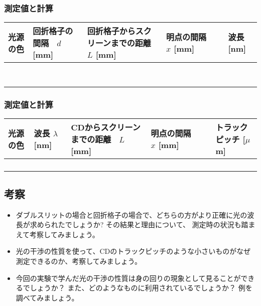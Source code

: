 \newpage

\subjikken{}
\subsubsection*{測定値と計算}
\hspace*{-\parindent}
\begin{tabular}{|p{1.5cm}|p{3.2cm}|p{3.2cm}|p{3.2cm}|p{3.2cm}|}
\hline
光源の色 & 回折格子の間隔　$d$ [mm] & 回折格子からスクリーンまでの距離 $L$ [mm] & 明点の間隔　　　$x$ [mm] & 波長
[nm] \\
\hline\hline
&&&&\\
\hline
&&&&\\
\hline
&&&&\\
\hline
&&&&\\
\hline
&&&&\\
\hline
&&&&\\
\hline
&&&&\\
\hline
&&&&\\
\hline
\end{tabular}

\bigskip\bigskip\bigskip\bigskip

\subjikken{}
\subsubsection*{測定値と計算}
\hspace*{-\parindent}
\begin{tabular}{|p{1.5cm}|p{3.2cm}|p{3.2cm}|p{3.2cm}|p{3.2cm}|}
\hline
光源の色 & 波長 $\lambda$ [nm] & CDからスクリーンまでの距離　$L$ [mm] & 明点の間隔　　　$x$ [mm] & トラックピッチ
[$\mu$m] \\
\hline\hline
&&&&\\
\hline
&&&&\\
\hline
&&&&\\
\hline
&&&&\\
\hline
\end{tabular}

\newpage

\subsection*{考察}

\begin{itemize}

\item ダブルスリットの場合と回折格子の場合で、どちらの方がより正確に光の波長が求められたでしょうか? その結果と理由について、
測定時の状況も踏まえて考察してみましょう。

\vspace{6cm}

\item 光の干渉の性質を使って、CDのトラックピッチのような小さいものがなぜ測定できるのか、考察してみましょう。

\vspace{6cm}

\item 今回の実験で学んだ光の干渉の性質は身の回りの現象として見ることができるでしょうか？ また、どのようなものに利用されているでしょうか？ 例を調べてみましょう。

\end{itemize}

